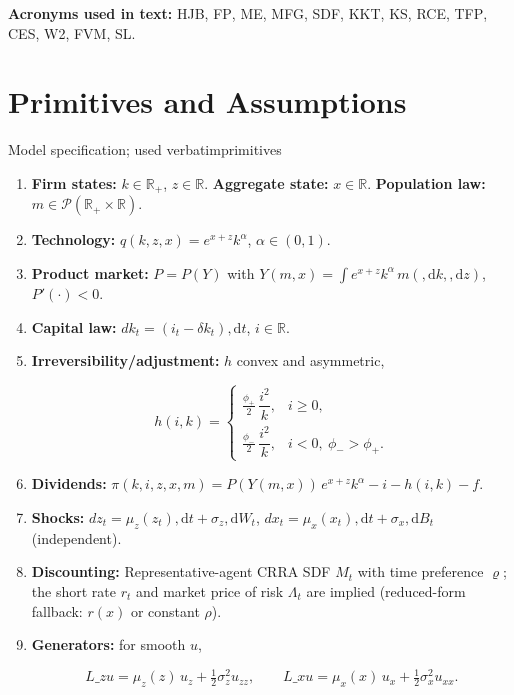﻿\documentclass[11pt,letterpaper,oneside]{article}
\numberwithin{equation}{section}
\newcommand{\ac}[1]{{\mdseries\textsc{#1}}}
\newcommand{\printacronyms}{}
\newcommand{\R}{\mathbb{R}}
\newcommand{\1}{\mathbf{1}}
\newcommand{\diff}{,\mathrm{d}}
\newcommand{\Lz}{L\_z}
\newcommand{\Lx}{L\_x}
\newcommand{\YY}{Y(m,x)}
\begin{document}
\medskip
\noindent\textbf{Acronyms used in text:} \ac{HJB}, \ac{FP}, \ac{ME}, \ac{MFG}, \ac{SDF}, \ac{KKT}, \ac{KS}, \ac{RCE}, \ac{TFP}, \ac{CES}, \ac{W2}, \ac{FVM}, \ac{SL}.
\medskip

\printacronyms

\section{Primitives and Assumptions}

\begin{assumption}{Model specification; used verbatim}{primitives}
\begin{enumerate}[label=(\roman*),itemsep=0.25em]
\item \textbf{Firm states:} $k\in\R_+$, $z\in\R$. \textbf{Aggregate state:} $x\in\R$. \textbf{Population law:} $m\in\mathcal P(\R_+\times\R)$.
\item \textbf{Technology:} $q(k,z,x)=e^{x+z}k^\alpha$, $\alpha\in(0,1)$.
\item \textbf{Product market:} $P=P(Y)$ with $Y(m,x)=\int e^{x+z}k^\alpha\, m(\diff k,\diff z)$, $P'(\cdot)<0$.
\item \textbf{Capital law:} $dk_t=(i_t-\delta k_t)\diff t$, $i\in\R$.
\item \textbf{Irreversibility/adjustment:} $h$ convex and asymmetric,

$$
h(i,k)=
\begin{cases}
\tfrac{\phi_+}{2}\,\dfrac{i^2}{k}, & i\ge 0,\\[3pt]
\tfrac{\phi_-}{2}\,\dfrac{i^2}{k}, & i<0,\ \phi_->\phi_+.
\end{cases}
$$

\item \textbf{Dividends:} $\pi(k,i,z,x,m)=P(\YY)\,e^{x+z}k^\alpha - i - h(i,k) - f$.
\item \textbf{Shocks:} $dz_t=\mu_z(z_t)\diff t+\sigma_z\diff W_t$, $dx_t=\mu_x(x_t)\diff t+\sigma_x\diff B_t$ (independent).
\item \textbf{Discounting:} Representative-agent CRRA SDF $M_t$ with time preference $\varrho$; the short rate $r_t$ and market price of risk $\Lambda_t$ are implied (reduced-form fallback: $r(x)$ or constant $\rho$).
\item \textbf{Generators:} for smooth $u$,

$$
\Lz u=\mu_z(z)\,u_z+\tfrac12\sigma_z^2 u_{zz},\qquad
\Lx u=\mu_x(x)\,u_x+\tfrac12\sigma_x^2 u_{xx}.
$$

\end{enumerate}
\end{assumption}
\end{document}
